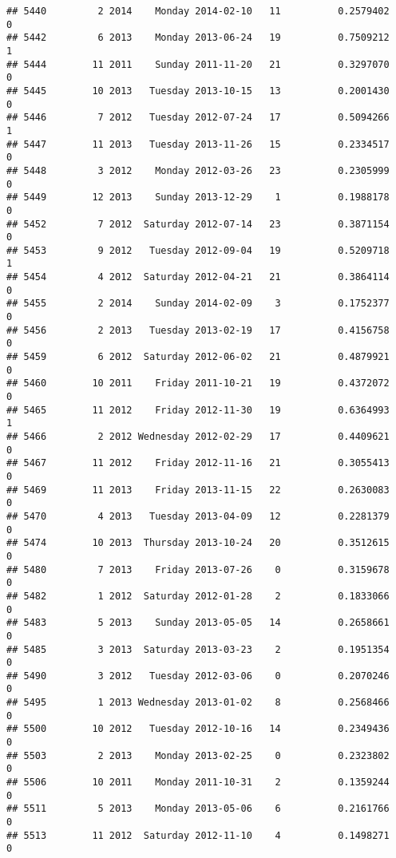\documentclass[
]{article}
\begin{document}
\begin{verbatim}
## 5440         2 2014    Monday 2014-02-10   11          0.2579402             0
## 5442         6 2013    Monday 2013-06-24   19          0.7509212             1
## 5444        11 2011    Sunday 2011-11-20   21          0.3297070             0
## 5445        10 2013   Tuesday 2013-10-15   13          0.2001430             0
## 5446         7 2012   Tuesday 2012-07-24   17          0.5094266             1
## 5447        11 2013   Tuesday 2013-11-26   15          0.2334517             0
## 5448         3 2012    Monday 2012-03-26   23          0.2305999             0
## 5449        12 2013    Sunday 2013-12-29    1          0.1988178             0
## 5452         7 2012  Saturday 2012-07-14   23          0.3871154             0
## 5453         9 2012   Tuesday 2012-09-04   19          0.5209718             1
## 5454         4 2012  Saturday 2012-04-21   21          0.3864114             0
## 5455         2 2014    Sunday 2014-02-09    3          0.1752377             0
## 5456         2 2013   Tuesday 2013-02-19   17          0.4156758             0
## 5459         6 2012  Saturday 2012-06-02   21          0.4879921             0
## 5460        10 2011    Friday 2011-10-21   19          0.4372072             0
## 5465        11 2012    Friday 2012-11-30   19          0.6364993             1
## 5466         2 2012 Wednesday 2012-02-29   17          0.4409621             0
## 5467        11 2012    Friday 2012-11-16   21          0.3055413             0
## 5469        11 2013    Friday 2013-11-15   22          0.2630083             0
## 5470         4 2013   Tuesday 2013-04-09   12          0.2281379             0
## 5474        10 2013  Thursday 2013-10-24   20          0.3512615             0
## 5480         7 2013    Friday 2013-07-26    0          0.3159678             0
## 5482         1 2012  Saturday 2012-01-28    2          0.1833066             0
## 5483         5 2013    Sunday 2013-05-05   14          0.2658661             0
## 5485         3 2013  Saturday 2013-03-23    2          0.1951354             0
## 5490         3 2012   Tuesday 2012-03-06    0          0.2070246             0
## 5495         1 2013 Wednesday 2013-01-02    8          0.2568466             0
## 5500        10 2012   Tuesday 2012-10-16   14          0.2349436             0
## 5503         2 2013    Monday 2013-02-25    0          0.2323802             0
## 5506        10 2011    Monday 2011-10-31    2          0.1359244             0
## 5511         5 2013    Monday 2013-05-06    6          0.2161766             0
## 5513        11 2012  Saturday 2012-11-10    4          0.1498271             0

\end{verbatim}
\end{document}
